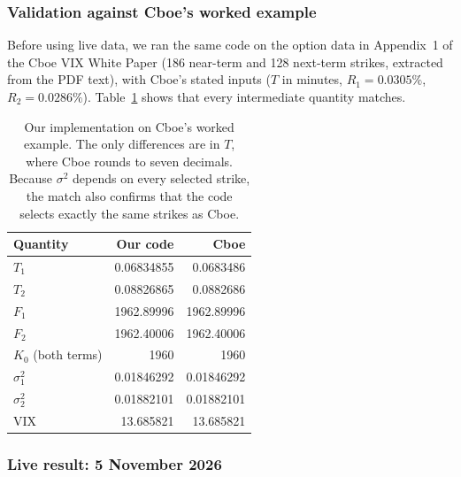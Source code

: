 \subsubsection{Validation against Cboe's worked example}

Before using live data, we ran the same code on the option data in Appendix~1 of the Cboe VIX White Paper \cite{cboewp} (186 near-term and 128 next-term strikes, extracted from the PDF text), with Cboe's stated inputs ($T$ in minutes, $R_1=0.0305\%$, $R_2=0.0286\%$). Table~\ref{tab:cboe} shows that every intermediate quantity matches.

\begin{table}[H]
\centering
\small
\begin{tabular}{@{}lrr@{}}
\toprule
\textbf{Quantity} & \textbf{Our code} & \textbf{Cboe}\\
\midrule
$T_1$ & 0.06834855 & 0.0683486\\
$T_2$ & 0.08826865 & 0.0882686\\
$F_1$ & 1962.89996 & 1962.89996\\
$F_2$ & 1962.40006 & 1962.40006\\
$K_0$ (both terms) & 1960 & 1960\\
$\sigma_1^2$ & 0.01846292 & 0.01846292\\
$\sigma_2^2$ & 0.01882101 & 0.01882101\\
VIX & 13.685821 & 13.685821\\
\bottomrule
\end{tabular}
\caption{Our implementation on Cboe's worked example. The only differences are in $T$, where Cboe rounds to seven decimals. Because $\sigma^2$ depends on every selected strike, the match also confirms that the code selects exactly the same strikes as Cboe.}
\label{tab:cboe}
\end{table}

\subsubsection{Live result: 5 November 2026}
\label{sec:live}


